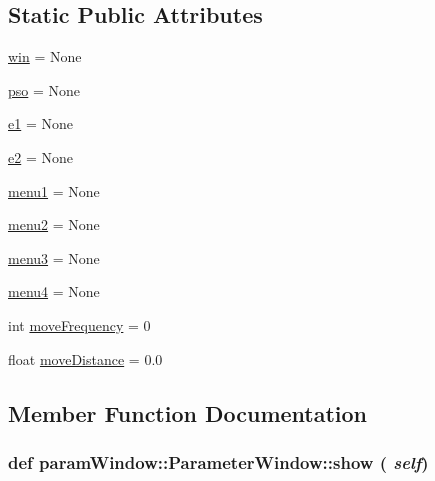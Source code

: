 \subsection*{Static Public Attributes}
\begin{CompactItemize}
\item 
\hyperlink{classparamWindow_1_1ParameterWindow_40ea9abf10ee2e3f7c7f3bbe6daf1fff}{win} = None
\item 
\hyperlink{classparamWindow_1_1ParameterWindow_2bb571bbbaeef1a5c04e01e82ae9db6b}{pso} = None
\item 
\hyperlink{classparamWindow_1_1ParameterWindow_8d3b3fd9e76d260c265921beb8cb9678}{e1} = None
\item 
\hyperlink{classparamWindow_1_1ParameterWindow_e2d35077a7523dffea8d1a149ba8e522}{e2} = None
\item 
\hyperlink{classparamWindow_1_1ParameterWindow_85ba4c1ca57cfec0e4172047aff37581}{menu1} = None
\item 
\hyperlink{classparamWindow_1_1ParameterWindow_808cb21b2cf2e9fa7083292038f32488}{menu2} = None
\item 
\hyperlink{classparamWindow_1_1ParameterWindow_9160012369bd1e913b22386d88710403}{menu3} = None
\item 
\hyperlink{classparamWindow_1_1ParameterWindow_499c3fe28e684d1a7721ef7dfe24ecc6}{menu4} = None
\item 
int \hyperlink{classparamWindow_1_1ParameterWindow_da12db97e76480cbe151954687656746}{moveFrequency} = 0
\item 
float \hyperlink{classparamWindow_1_1ParameterWindow_8153f1439805cf6ab5ea95c8d130c61d}{moveDistance} = 0.0
\end{CompactItemize}


\subsection{Member Function Documentation}
\hypertarget{classparamWindow_1_1ParameterWindow_8963aedcc45910d9681cda72e767c7f5}{
\subsubsection{\setlength{\rightskip}{0pt plus 5cm}def paramWindow::ParameterWindow::show ( {\em self})}}
\label{classparamWindow_1_1ParameterWindow_8963aedcc45910d9681cda72e767c7f5}


